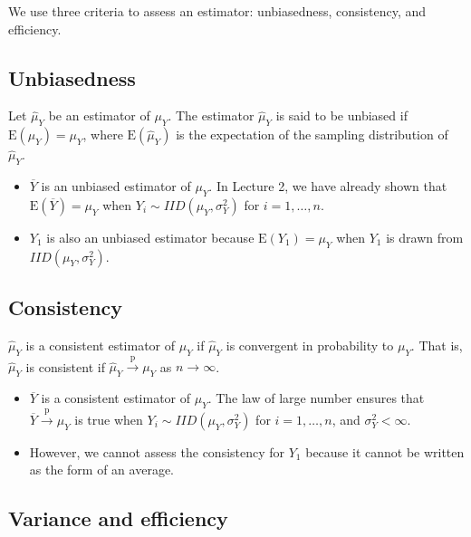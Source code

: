 \documentclass[a4paper,11pt]{article}
\begin{document}
We use three criteria to assess an estimator: unbiasedness,
consistency, and efficiency. 

\subsection{Unbiasedness}
\label{sec:org1c1b788}

Let \(\hat{\mu}_Y\) be an estimator of \(\mu_Y\). The estimator
\(\hat{\mu}_Y\) is said to be unbiased if \(\mathrm{E}(\hat{\mu}_Y) =
\mu_Y\), where \(\mathrm{E}(\hat{\mu}_Y)\) is the expectation of the
sampling distribution of \(\hat{\mu}_Y\).

\begin{itemize}
\item \(\overline{Y}\) is an unbiased estimator of \(\mu_Y\). In Lecture 2, we
have already shown that \(\mathrm{E}(\overline{Y}) = \mu_Y\) when \(Y_i
  \sim IID(\mu_Y, \sigma^2_Y)\) for \(i=1, \ldots, n\).
\item \(Y_1\) is also an unbiased estimator because \(\mathrm{E}(Y_1) =
  \mu_Y\) when \(Y_1\) is drawn from \(IID(\mu_Y, \sigma^2_Y)\).
\end{itemize}

\subsection{Consistency}
\label{sec:org555c45f}

\(\hat \mu_Y\) is a consistent estimator of \(\mu_Y\) if \(\hat{\mu}_Y\) is
convergent in probability to \(\mu_Y\). That is, \(\hat{\mu}_Y\) is
consistent if \(\hat{\mu}_Y \xrightarrow{\text{ p }} \mu_Y\) as \(n
\rightarrow \infty\). 

\begin{itemize}
\item \(\overline{Y}\) is a consistent estimator of \(\mu_Y\). The law of large
number ensures that \(\overline{Y} \xrightarrow{\text{ p }} \mu_Y\) is
true when \(Y_i \sim IID(\mu_Y, \sigma^2_Y)\) for \(i=1, \ldots, n\), and \(\sigma^2_Y <
  \infty\).

\item However, we cannot assess the consistency for \(Y_1\) because it cannot
be written as the form of an average.
\end{itemize}

\subsection{Variance and efficiency}
\label{sec:org77a6d27}
\end{document}
